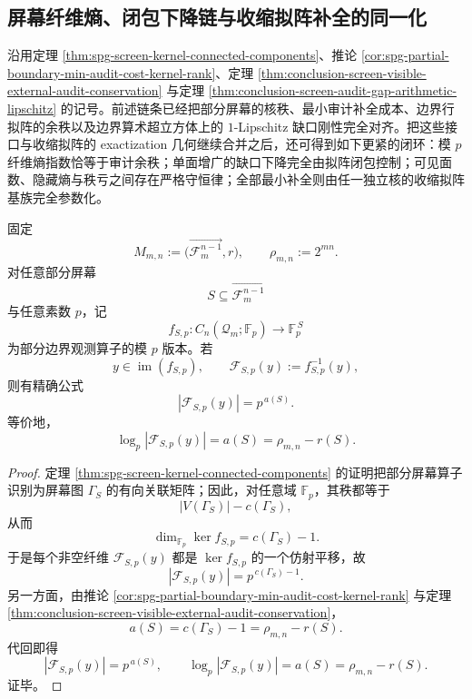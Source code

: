 \subsection{屏幕纤维熵、闭包下降链与收缩拟阵补全的同一化}\label{subsec:conclusion-screen-fiber-entropy-closure-contraction-geodesic}
沿用定理 \ref{thm:spg-screen-kernel-connected-components}、推论 \ref{cor:spg-partial-boundary-min-audit-cost-kernel-rank}、定理 \ref{thm:conclusion-screen-visible-external-audit-conservation} 与定理 \ref{thm:conclusion-screen-audit-gap-arithmetic-lipschitz} 的记号。前述链条已经把部分屏幕的核秩、最小审计补全成本、边界行拟阵的余秩以及边界算术超立方体上的 \(1\)-Lipschitz 缺口刚性完全对齐。把这些接口与收缩拟阵的 exactization 几何继续合并之后，还可得到如下更紧的闭环：模 \(p\) 纤维熵指数恰等于审计余秩；单面增广的缺口下降完全由拟阵闭包控制；可见面数、隐藏熵与秩亏之间存在严格守恒律；全部最小补全则由任一独立核的收缩拟阵基族完全参数化。

\begin{theorem}\label{thm:conclusion-screen-modp-fiber-entropy-audit-corank}
固定
\[
M_{m,n}:=\bigl(\overrightarrow{\mathcal F_m^{n-1}},r\bigr),
\qquad
\rho_{m,n}:=2^{mn}.
\]
对任意部分屏幕
\[
S\subseteq \overrightarrow{\mathcal F_m^{n-1}}
\]
与任意素数 \(p\)，记
\[
f_{S,p}:C_n(\mathcal Q_m;\mathbb F_p)\longrightarrow \mathbb F_p^{\,S}
\]
为部分边界观测算子的模 \(p\) 版本。若
\[
y\in \operatorname{im}(f_{S,p}),
\qquad
\mathcal F_{S,p}(y):=f_{S,p}^{-1}(y),
\]
则有精确公式
\[
|\mathcal F_{S,p}(y)|=p^{\,a(S)}.
\]
等价地，
\[
\log_p |\mathcal F_{S,p}(y)|=a(S)=\rho_{m,n}-r(S).
\]
\end{theorem}
\begin{proof}
定理 \ref{thm:spg-screen-kernel-connected-components} 的证明把部分屏幕算子识别为屏幕图 \(\Gamma_S\) 的有向关联矩阵；因此，对任意域 \(\mathbb F_p\)，其秩都等于
\[
|V(\Gamma_S)|-c(\Gamma_S),
\]
从而
\[
\dim_{\mathbb F_p}\ker f_{S,p}=c(\Gamma_S)-1.
\]
于是每个非空纤维 \(\mathcal F_{S,p}(y)\) 都是 \(\ker f_{S,p}\) 的一个仿射平移，故
\[
|\mathcal F_{S,p}(y)|=p^{\,c(\Gamma_S)-1}.
\]
另一方面，由推论 \ref{cor:spg-partial-boundary-min-audit-cost-kernel-rank} 与定理 \ref{thm:conclusion-screen-visible-external-audit-conservation}，
\[
a(S)=c(\Gamma_S)-1=\rho_{m,n}-r(S).
\]
代回即得
\[
|\mathcal F_{S,p}(y)|=p^{\,a(S)},
\qquad
\log_p |\mathcal F_{S,p}(y)|=a(S)=\rho_{m,n}-r(S).
\]
证毕。
\end{proof}


